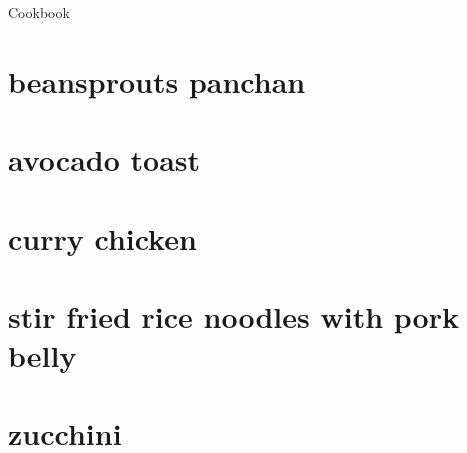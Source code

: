 \documentclass[a4paper,12pt]{article}
\begin{document}
Cookbook
\clearpage
\section{beansprouts panchan}

\clearpage
\section{avocado toast}

\clearpage
\section{curry chicken}

\clearpage
\section{stir fried rice noodles with pork belly}

\clearpage
\section{zucchini}
\end{document}
